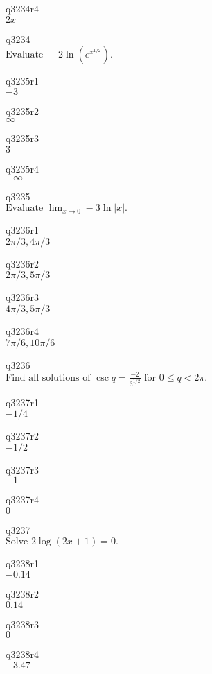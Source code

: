 q3234r4\\
\(\displaystyle 2x \)

q3234\\
\(\displaystyle \text{Evaluate } -2\ln(e^{x^{1/2}}). \)

q3235r1\\
\(\displaystyle -3 \)

q3235r2\\
\(\displaystyle \infty \)

q3235r3\\
\(\displaystyle 3 \)

q3235r4\\
\(\displaystyle -\infty \)

q3235\\
\(\displaystyle \text{Evaluate } \lim_{x \rightarrow 0} -3\ln|x|. \)

q3236r1\\
\(\displaystyle 2\pi/3, 4\pi/3 \)

q3236r2\\
\(\displaystyle 2\pi/3, 5\pi/3 \)

q3236r3\\
\(\displaystyle 4\pi/3, 5\pi/3 \)

q3236r4\\
\(\displaystyle 7\pi/6, 10\pi/6 \)

q3236\\
\(\displaystyle \text{Find all solutions of } \csc q = \frac{-2}{3^{1/2}} \text{ for } 0 \leq q < 2\pi. \)

q3237r1\\
\(\displaystyle -1/4 \)

q3237r2\\
\(\displaystyle -1/2 \)

q3237r3\\
\(\displaystyle -1 \)

q3237r4\\
\(\displaystyle 0 \)

q3237\\
\(\displaystyle \text{Solve } 2\log(2x+1) = 0. \)

q3238r1\\
\(\displaystyle -0.14 \)

q3238r2\\
\(\displaystyle 0.14 \)

q3238r3\\
\(\displaystyle 0 \)

q3238r4\\
\(\displaystyle -3.47 \)


